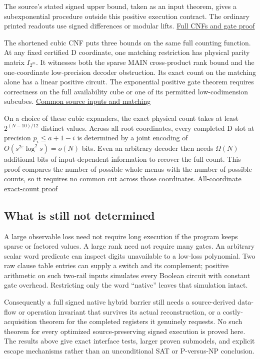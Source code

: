 \documentclass[
  11pt,
]{article}
\begin{document}
The source's stated signed upper bound, taken as an input theorem, gives
a subexponential procedure outside this positive execution contract. The
ordinary printed readouts use signed differences or modular lifts.
\hyperref[v8-section-stronger-family]{Full CNFs and gate proof}

The shortened cubic CNF puts three bounds on the same full counting
function. At any fixed certified D coordinate, one matching restriction
has physical parity matrix \(I_{2^m}\). It witnesses both the sparse
MAIN cross-product rank bound and the one-coordinate low-precision
decoder obstruction. Its exact count on the matching alone has a linear
positive circuit. The exponential positive gate theorem requires
correctness on the full availability cube or one of its permitted
low-codimension subcubes. \hyperref[v8-section-common-native-family]{Common
source inputs and matching}

On a choice of these cubic expanders, the exact physical count takes at
least \(2^{(N-10)/12}\) distinct values. Across all root coordinates,
every completed D slot at precision \(p_i\le a+1-i\) is determined by a
joint encoding of \(O(s^{2\varepsilon}\log^2s)=o(N)\) bits. Even an
arbitrary decoder then needs \(\Omega(N)\) additional bits of
input-dependent information to recover the full count. This proof
compares the number of possible whole menus with the number of possible
counts, so it requires no common cut across those coordinates.
\hyperref[v8-section-pooled-menu-barrier]{All-coordinate exact-count proof}

\subsection{What is still not
determined}\label{v8-what-is-still-not-determined}

A large observable loss need not require long execution if the program
keeps sparse or factored values. A large rank need not require many
gates. An arbitrary scalar word predicate can inspect digits unavailable
to a low-loss polynomial. Two raw clause table entries can supply a
switch and its complement; positive arithmetic on such two-rail inputs
simulates every Boolean circuit with constant gate overhead. Restricting
only the word ``native'' leaves that simulation intact.

Consequently a full signed native hybrid barrier still needs a
source-derived data-flow or operation invariant that survives its actual
reconstruction, or a costly-acquisition theorem for the completed
registers it genuinely requests. No such theorem for every optimized
source-preserving signed execution is proved here. The results above
give exact interface tests, larger proven submodels, and explicit escape
mechanisms rather than an unconditional SAT or P-versus-NP conclusion.
\end{document}
